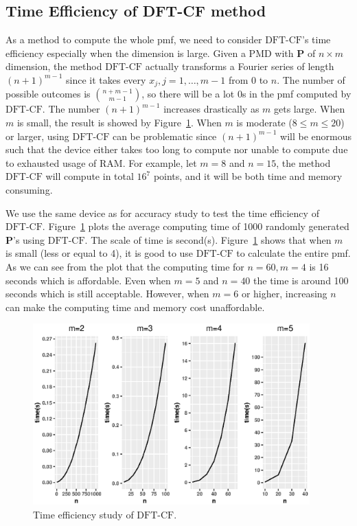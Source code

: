 \documentclass[12pt]{article}
\newcommand{\Pmat}{\mathbf{P}}
\newcommand{\PMD}{\textrm{PMD}}
\newcommand{\dft}{{\textrm{DFT-CF}}}
\begin{document}
\subsection{Time Efficiency of DFT-CF method}
As a method to compute the whole pmf, we need to consider $\dft$'s time efficiency especially when the dimension is large. Given a $\PMD$ with $\Pmat$ of $n \times m$ dimension, the method $\dft$ actually transforms a Fourier series of length $(n+1)^{m-1}$ since it takes every $x_j,j=1,\dots,m-1$ from 0 to $n$. The number of possible outcomes is $\binom{n+m-1}{m-1}$, so there will be a lot 0s in the pmf computed by $\dft$. The number $(n+1)^{m-1}$ increases drastically as $m$ gets large. When $m$ is small, the result is showed by Figure~\ref{fig:time.eff}. When $m$ is moderate ($8 \leq m \leq 20$) or larger, using $\dft$ can be problematic since $(n+1)^{m-1}$ will be enormous such that the device either takes too long to compute nor unable to compute due to exhausted usage of RAM. For example, let $m=8$ and $n=15$, the method $\dft$ will compute in total $16^7$ points, and it will be both time and memory consuming.

We use the same device as for accuracy study to test the time efficiency of $\dft$. Figure~\ref{fig:time.eff} plots the average computing time of 1000 randomly generated $\Pmat$'s using $\dft$. The scale of time is second(s). Figure~\ref{fig:time.eff} shows that when $m$ is small (less or equal to 4), it is good to use $\dft$ to calculate the entire pmf. As we can see from the plot that the computing time for $n=60, m=4$ is 16 seconds which is affordable. Even when $m=5$ and $n=40$ the time is around 100 seconds which is still acceptable. However, when $m=6$ or higher, increasing $n$ can make the computing time and memory cost unaffordable.


\begin{figure}%
\begin{center}
	\includegraphics[width=0.95\textwidth]{figures/effi.eps}
	\caption{Time efficiency study of $\dft$.}
	\label{fig:time.eff}
\end{center}
\end{figure}
\end{document}
